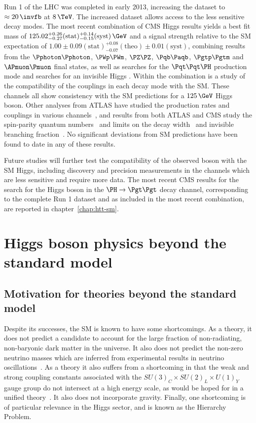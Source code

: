 Run 1 of the LHC was completed in early 2013, increasing the dataset to
$\approx20\,\invfb$ at $8\,\TeV$. The increased dataset allows access to the less
sensitive decay modes. The most recent combination of CMS Higgs results yields a
best fit mass of
$125.02^{+0.26}_{-0.27}(\text{stat})^{+0.14}_{-0.15}(\text{syst})\,\GeV$ and a
signal strength relative to the \ac{SM} expectation of
$1.00\pm0.09(\text{stat})^{+0.08}_{-0.07}(\text{theo})\pm0.01(\text{syst})$,
combining results from the $\Pphoton\Pphoton$, $\PWp\PWm$, $\PZ\PZ$,
$\Pqb\Paqb$, $\Pgtp\Pgtm$ and $\APmuon\Pmuon$ final states, as well as 
searches for the $\Pqt\Pqt\PH$ production mode and searches for an invisible
Higgs \cite{CMScomb}. Within the combination is a study of the compatibility of
the couplings in each decay mode with the \ac{SM}. 
These channels all show consistency with the \ac{SM}
predictions for a $125\,\GeV$ Higgs boson. Other analyses from ATLAS have
studied the production rates and couplings in various channels~\cite{Aad:2014eva,Aad:2014lwa,Aad:2015vsa}, 
and results from both ATLAS and CMS study the spin-parity quantum
numbers~\cite{Chatrchyan:2013mxa,Chatrchyan:2013iaa,Aad:2013xqa} and limits on
the decay width~\cite{Khachatryan:2014iha} and invisible branching
fraction~\cite{Aad:2014iia,Chatrchyan:2014tja}. No significant deviations from \ac{SM}
predictions have been found to date in any of these results.

Future studies will further test the compatibility of the observed boson with
the \ac{SM} Higgs, including discovery and precision measurements in the
channels which are less sensitive and require more data. 
The most recent CMS results for the search for the Higgs boson in the $\HToTauTau$
decay channel, corresponding to the complete Run 1 dataset and as included in
the most recent combination, are reported in chapter~\ref{chap:htt-sm}.

\section{Higgs boson physics beyond the standard model}
\label{sec:BSM}

\subsection{Motivation for theories beyond the standard model}
\label{sec:hierarchyproblem}

Despite its successes, the \ac{SM} is known to have some shortcomings. As a
theory, it does not predict a candidate to account for the large fraction of
non-radiating, non-baryonic dark matter in the universe. It also does not
predict the non-zero neutrino masses which are inferred from experimental
results in neutrino oscillations~\cite{PDG}. As a theory it also suffers from a
shortcoming in that the weak and strong coupling constants associated with the
$SU(3)_{C} \times SU(2)_{L} \times U(1)_{Y}$ gauge group do not intersect at a
high energy scale, as would be hoped for in a unified theory~\cite{Amaldi:1991cn}. It also does not
incorporate gravity. Finally, one shortcoming is of particular relevance 
in the Higgs sector, and is known as the Hierarchy Problem.

